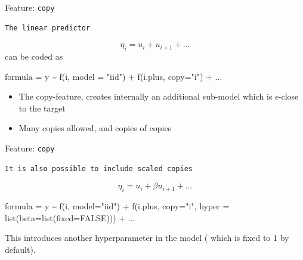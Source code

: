 \documentclass[
  ignorenonframetext,
]{beamer}
\newenvironment{Shaded}{\begin{snugshade}}{\end{snugshade}}
\newcommand{\AttributeTok}[1]{\textcolor[rgb]{0.77,0.63,0.00}{#1}}
\newcommand{\ConstantTok}[1]{\textcolor[rgb]{0.00,0.00,0.00}{#1}}
\newcommand{\FunctionTok}[1]{\textcolor[rgb]{0.00,0.00,0.00}{#1}}
\newcommand{\NormalTok}[1]{#1}
\newcommand{\OtherTok}[1]{\textcolor[rgb]{0.56,0.35,0.01}{#1}}
\newcommand{\SpecialCharTok}[1]{\textcolor[rgb]{0.00,0.00,0.00}{#1}}
\newcommand{\StringTok}[1]{\textcolor[rgb]{0.31,0.60,0.02}{#1}}
\begin{document}
\begin{frame}[fragile]{Feature: \texttt{copy}}
\protect\hypertarget{feature-copy-2}{}
\begin{verbatim}
The linear predictor
\end{verbatim}

\[
\eta_i = u_i + u_{i+1} + \ldots
\] can be coded as

\begin{Shaded}
\begin{Highlighting}[]
\NormalTok{   formula }\OtherTok{=}\NormalTok{ y }\SpecialCharTok{\textasciitilde{}} \FunctionTok{f}\NormalTok{(i, }\AttributeTok{model =} \StringTok{"iid"}\NormalTok{)}
                 \SpecialCharTok{+} \FunctionTok{f}\NormalTok{(i.plus, }\AttributeTok{copy=}\StringTok{"i"}\NormalTok{) }\SpecialCharTok{+}\NormalTok{ ...}
\end{Highlighting}
\end{Shaded}

\begin{itemize}
\item
  The copy-feature, creates internally an additional sub-model which is
  \(\epsilon\)-close to the target
\item
  Many copies allowed, and copies of copies
\end{itemize}
\end{frame}

\begin{frame}[fragile]{Feature: \texttt{copy}}
\protect\hypertarget{feature-copy-3}{}
\begin{verbatim}
It is also possible to include scaled copies
\end{verbatim}

\[
        \eta_i = u_i + \beta u_{i+1} + \ldots
\]

\hfill\break

\begin{Shaded}
\begin{Highlighting}[]
\NormalTok{   formula }\OtherTok{=}\NormalTok{ y }\SpecialCharTok{\textasciitilde{}} \FunctionTok{f}\NormalTok{(i, }\AttributeTok{model=}\StringTok{"iid"}\NormalTok{) }\SpecialCharTok{+}
                 \FunctionTok{f}\NormalTok{(i.plus, }\AttributeTok{copy=}\StringTok{"i"}\NormalTok{,}
                   \AttributeTok{hyper =} \FunctionTok{list}\NormalTok{(}\AttributeTok{beta=}\FunctionTok{list}\NormalTok{(}\AttributeTok{fixed=}\ConstantTok{FALSE}\NormalTok{)))}
                 \SpecialCharTok{+}\NormalTok{ ...}
\end{Highlighting}
\end{Shaded}

This introduces another hyperparameter in the model ( which is fixed to
1 by default).
\end{frame}
\end{document}
